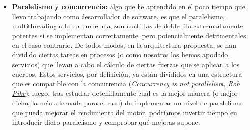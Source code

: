 \begin{itemize}
    \item \textbf{Paralelismo y concurrencia:} algo que he aprendido en el poco tiempo que llevo trabajando como desarrollador de software, es que el paralelismo, multithreading o la concurrencia, son cuchillas de doble filo extremadamente potentes si se implementan correctamente, pero potencialmente detrimentales en el caso contrario. De todos modos, en la arquitectura propuesta, se han dividido ciertas tareas en procesos (o como nosotros los hemos apodado, servicios) que llevan a cabo el cálculo de ciertas fuerzas que se aplican a los cuerpos. Estos servicios, por definición, ya están divididos en una estructura que es compatible con la concurrencia (\href{https://www.youtube.com/watch?v=oV9rvDllKEg}{\textit{Concurrency is not parallelism, Rob Pike}}); luego, tras estudiar detenidamente cuál es la mejor manera (o mejor dicho, la más adecuada para el caso) de implementar un nivel de paralelismo que pueda mejorar el rendimiento del motor, podríamos invertir tiempo en introducir dicho paralelismo y comprobar qué mejoras supone.
\end{itemize}
